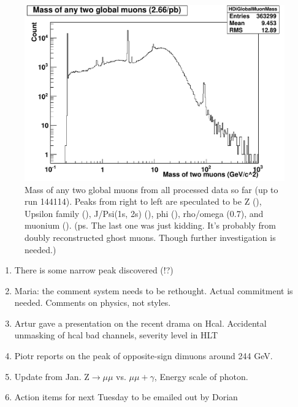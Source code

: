 \begin{figure}
\includegraphics[width=120mm]{DailyLog/6264/6264DiGlobalMuonMass_DataAll.pdf}
\caption{Mass of any two global muons from all processed data so far (up to run 144114).  Peaks from right to left are speculated to be
Z (), Upsilon family (), J/Psi(1s, 2s) (), phi (), rho/omega (0.7), and muonium ().
(ps. The last one was just kidding.  It's probably from doubly reconstructed ghost muons.  Though further investigation is needed.)}
\label{Figure_6264DiGlobalMuonMass_DataAll}
\end{figure}



\begin{enumerate}
\item There is some narrow peak discovered (!?)
\item Maria: the comment system needs to be rethought.  Actual commitment is needed.
Comments on physics, not styles.
\item Artur gave a presentation on the recent drama on Hcal.  Accidental unmasking of hcal bad channels,
severity level in HLT
\item Piotr reports on the peak of opposite-sign dimuons around 244 GeV.
\item Update from Jan.  Z$\rightarrow\mu\mu$ vs. $\mu\mu+\gamma$, Energy scale of photon.
\item Action items for next Tuesday to be emailed out by Dorian
\end{enumerate}


